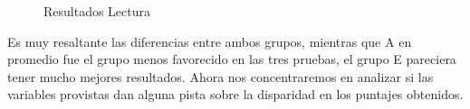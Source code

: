 \documentclass{article}
\begin{document}
    \vspace*{-9mm}
    \begin{figure}[H]
        \noindent{}
        \vspace*{-20mm}
        \caption{Resultados Lectura}
        \label{fig:minipage1}
    \end{figure}
     
    Es muy resaltante las diferencias entre ambos grupos, mientras que A en promedio fue el grupo menos favorecido en las
    tres pruebas, el grupo E pareciera tener mucho mejores resultados. Ahora nos concentraremos en analizar si las variables
    provistas dan alguna pista sobre la disparidad en los puntajes obtenidos.
\end{document}
